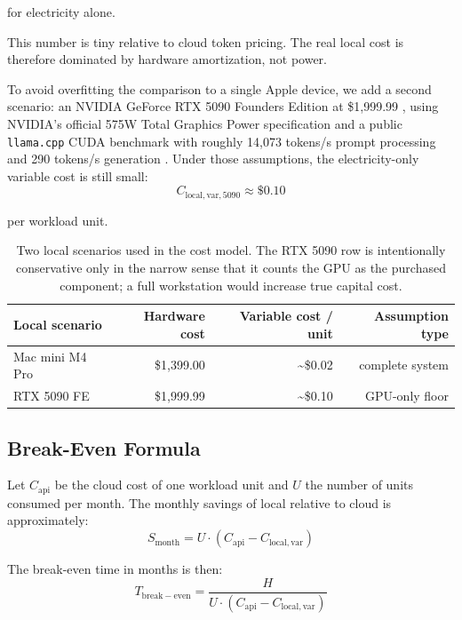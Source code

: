 \documentclass[11pt,a4paper]{article}
\begin{document}
for electricity alone.

This number is tiny relative to cloud token pricing. The real local cost is therefore dominated by hardware amortization, not power.

To avoid overfitting the comparison to a single Apple device, we add a second scenario: an NVIDIA GeForce RTX 5090 Founders Edition at \$1,999.99 \cite{nvidia_5090_price}, using NVIDIA's official 575W Total Graphics Power specification \cite{nvidia_5090_specs} and a public \texttt{llama.cpp} CUDA benchmark with roughly 14,073 tokens/s prompt processing and 290 tokens/s generation \cite{llamacpp_5090_bench}. Under those assumptions, the electricity-only variable cost is still small:
\begin{equation}
C_{\mathrm{local,var,5090}} \approx \$0.10
\end{equation}

per workload unit.

\begin{table}[t]
\centering
\small
\begin{tabular}{>{\raggedright\arraybackslash}p{3.0cm} r r r}
\toprule
\textbf{Local scenario} & \textbf{Hardware cost} & \textbf{Variable cost / unit} & \textbf{Assumption type} \\
\midrule
Mac mini M4 Pro & \$1,399.00 & \~{}\$0.02 & complete system \\
RTX 5090 FE & \$1,999.99 & \~{}\$0.10 & GPU-only floor \\
\bottomrule
\end{tabular}
\caption{Two local scenarios used in the cost model. The RTX 5090 row is intentionally conservative only in the narrow sense that it counts the GPU as the purchased component; a full workstation would increase true capital cost.}
\label{tab:local_scenarios}
\end{table}

\subsection{Break-Even Formula}

Let $C_{\mathrm{api}}$ be the cloud cost of one workload unit and $U$ the number of units consumed per month. The monthly savings of local relative to cloud is approximately:
\begin{equation}
S_{\mathrm{month}} = U \cdot (C_{\mathrm{api}} - C_{\mathrm{local,var}})
\end{equation}

The break-even time in months is then:
\begin{equation}
T_{\mathrm{break-even}} = \frac{H}{U \cdot (C_{\mathrm{api}} - C_{\mathrm{local,var}})}
\end{equation}
\end{document}

